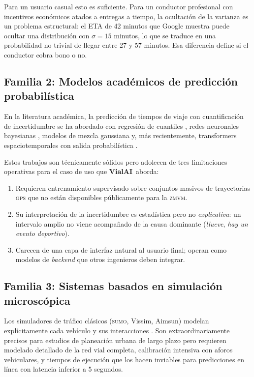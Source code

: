 \documentclass[11pt,a4paper]{article}
\newcommand{\VialAI}{\textbf{\textcolor{vialTeal}{Vial}\textcolor{vialAmber}{AI}}}
\newcommand{\ZMVM}{\textsc{zmvm}}
\begin{document}
Para un usuario casual esto es suficiente. Para un conductor
profesional con incentivos económicos atados a entregas a tiempo,
la ocultación de la varianza es un problema estructural: el ETA
de \num{42} minutos que Google muestra puede ocultar una
distribución con $\sigma = 15$ minutos, lo que se traduce en una
probabilidad no trivial de llegar entre \num{27} y \num{57}
minutos. Esa diferencia define si el conductor cobra bono o no.

\subsection{Familia 2: Modelos académicos de predicción probabilística}

En la literatura académica, la predicción de tiempos de viaje con
cuantificación de incertidumbre se ha abordado con regresión de
cuantiles \citep{koenker2005quantile}, redes neuronales bayesianas
\citep{gal2016dropout}, modelos de mezcla gaussiana
\citep{jenelius2013travel} y, más recientemente, transformers
espaciotemporales con salida probabilística
\citep{li2023stformer}.

Estos trabajos son técnicamente sólidos pero adolecen de tres
limitaciones operativas para el caso de uso que \VialAI\ aborda:

\begin{enumerate}
\item Requieren entrenamiento supervisado sobre conjuntos masivos
de trayectorias \textsc{gps} que no están disponibles públicamente
para la \ZMVM.
\item Su interpretación de la incertidumbre es estadística pero
no \emph{explicativa}: un intervalo amplio no viene acompañado de
la causa dominante (\emph{llueve}, \emph{hay un evento deportivo}).
\item Carecen de una capa de interfaz natural al usuario final;
operan como modelos de \emph{backend} que otros ingenieros deben
integrar.
\end{enumerate}

\subsection{Familia 3: Sistemas basados en simulación microscópica}

Los simuladores de tráfico clásicos (\textsc{sumo}, Vissim,
Aimsun) modelan explícitamente cada vehículo y sus interacciones
\citep{lopez2018sumo}. Son extraordinariamente precisos para
estudios de planeación urbana de largo plazo pero requieren
modelado detallado de la red vial completa, calibración intensiva
con aforos vehiculares, y tiempos de ejecución que los hacen
inviables para predicciones en línea con latencia inferior a
\num{5} segundos.
\end{document}
